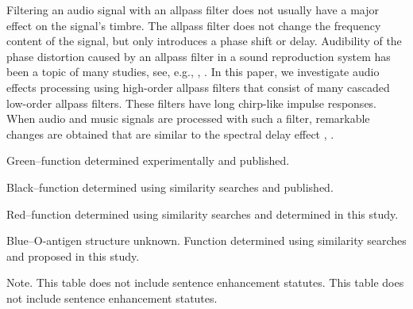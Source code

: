 \documentclass{aes2e}
\begin{document}
Filtering an audio signal with an allpass filter does not usually have a major effect on the signal's timbre. The allpass filter does not change the frequency content of the signal, but only introduces a phase shift or delay. Audibility of the phase distortion caused by an allpass filter in a sound reproduction system has been a topic of many studies, see, e.g., \cite{DEK1}, \cite{DEK2}. In this paper, we investigate audio effects processing using high-order allpass filters that consist of many cascaded low-order allpass filters. These filters have long chirp-like impulse responses. When audio and music signals are processed with such a filter, remarkable changes are obtained that are similar to the spectral delay effect  \cite{DEK3}, \cite{DEK4}.
\begin{arabiclist}
\item{}Green--function determined experimentally and published.
\item{}Black--function determined using similarity searches and published.
\item{}Red--function determined using similarity searches and determined in this study.
\item{}Blue--O-antigen structure unknown. Function determined using similarity searches and proposed in this study.
\end{arabiclist}

\begin{table}
\begin{tabnote}
Note. This table does not include sentence enhancement statutes.  This table does not include sentence enhancement statutes.
\end{tabnote}
\end{table}
\end{document}

